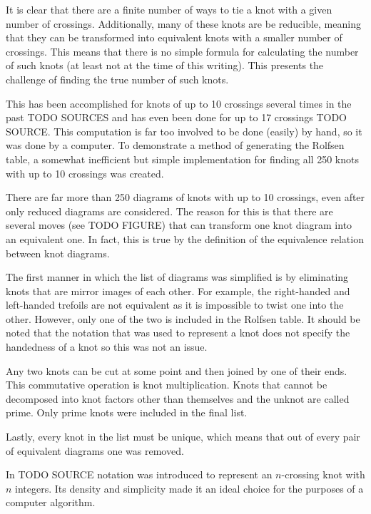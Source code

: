 \begin{paper}

It is clear that there are a finite number of ways to tie a knot with a given
number of crossings.
Additionally, many of these knots are be reducible, meaning that they can be
transformed into equivalent knots with a smaller number of crossings.
This means that there is no simple formula for calculating the number of such
knots (at least not at the time of this writing).
This presents the challenge of finding the true number of such knots.

This has been accomplished for knots of up to 10 crossings several times in the
past TODO SOURCES and has even been done for up to 17 crossings TODO
SOURCE.
This computation is far too involved to be done (easily) by hand, so it was done
by a computer.
To demonstrate a method of generating the Rolfsen table, a somewhat inefficient
but simple implementation for finding all 250 knots with up to 10 crossings was
created.

There are far more than 250 diagrams of knots with up to 10 crossings, even
after only reduced diagrams are considered.
The reason for this is that there are several moves (see TODO FIGURE) that can
transform one knot diagram into an equivalent one.
In fact, this is true by the definition of the equivalence relation between knot
diagrams.

The first manner in which the list of diagrams was simplified is by eliminating
knots that are mirror images of each other.
For example, the right-handed and left-handed trefoils are not equivalent as it
is impossible to twist one into the other.
However, only one of the two is included in the Rolfsen table.
It should be noted that the notation that was used to represent a knot does not
specify the handedness of a knot so this was not an issue.

Any two knots can be cut at some point and then joined by one of their ends.
This commutative operation is knot multiplication.
Knots that cannot be decomposed into knot factors other than themselves and the
unknot are called prime.
Only prime knots were included in the final list.

Lastly, every knot in the list must be unique, which means that out of every
pair of equivalent diagrams one was removed.


In TODO SOURCE notation was introduced to represent an $n$-crossing knot with
$n$ integers.
Its density and simplicity made it an ideal choice for the purposes of a
computer algorithm.


\end{paper}
